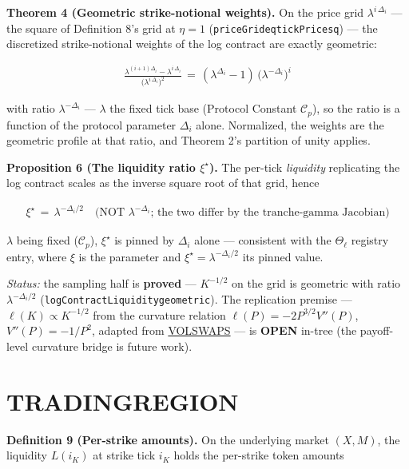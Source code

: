 \documentclass[11pt]{article}
\renewcommand{\_}{\textunderscore\allowbreak}
\begin{document}
\textbf{Theorem 4 (Geometric strike-notional weights).} On the price grid \(\lambda^{i\,\Delta_i}\) --- the square of Definition 8's grid at \(\eta = 1\) (\texttt{priceGrid\_eq\_tickPrice\_sq}) --- the discretized strike-notional weights of the log contract are exactly geometric:

\[
    \begin{aligned}
        \frac{\lambda^{(i+1)\Delta_i} - \lambda^{i\,\Delta_i}}{\big(\lambda^{i\,\Delta_i}\big)^{2}} \, = \, (\lambda^{\Delta_i}-1)\,\big(\lambda^{-\Delta_i}\big)^{i}
    \end{aligned}
\]

with ratio \(\lambda^{-\Delta_i}\) --- \(\lambda\) the fixed tick base (Protocol Constant \(\mathcal{C}_p\)), so the ratio is a function of the protocol parameter \(\Delta_i\) alone. Normalized, the weights are the geometric profile at that ratio, and Theorem 2's partition of unity applies.

\textbf{Proposition 6 (The liquidity ratio \(\xi^{\star}\)).} The per-tick \emph{liquidity} replicating the log contract scales as the inverse square root of that grid, hence

\[
    \begin{aligned}
        \xi^{\star} \, = \, \lambda^{-\Delta_i/2} \quad \text{(NOT } \lambda^{-\Delta_i}\text{; the two differ by the tranche-gamma Jacobian)}
    \end{aligned}
\]

\(\lambda\) being fixed (\(\mathcal{C}_p\)), \(\xi^{\star}\) is pinned by \(\Delta_i\) alone --- consistent with the \(\Theta_{\ell}\) registry entry, where \(\xi\) is the parameter and \(\xi^{\star} = \lambda^{-\Delta_i/2}\) its pinned value.

\emph{Status:} the sampling half is \textbf{proved} --- \(K^{-1/2}\) on the grid is geometric with ratio \(\lambda^{-\Delta_i/2}\) (\texttt{logContractLiquidity\_geometric}). The replication premise --- \(\ell(K) \propto K^{-1/2}\) from the curvature relation \(\ell(P) = -2P^{3/2}V''(P)\), \(V''(P) = -1/P^2\), adapted from \href{../refs/DemeterfietalVarianceSwaps.pdf}{VOL\_SWAPS} --- is \textbf{OPEN} in-tree (the payoff-level curvature bridge is future work).

\section*{TRADING\_REGION}\label{trading_region}

\textbf{Definition 9 (Per-strike amounts).} On the underlying market \((X, M)\), the liquidity \(L(i_K)\) at strike tick \(i_K\) holds the per-strike token amounts
\end{document}
